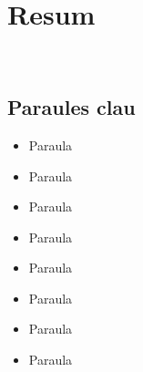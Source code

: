 \chapter*{Resum}\label{ch:abstract-ca}

\lipsum[1-3] \\

\section*{Paraules clau}\label{sec:keywords-ca}
\begin{multicols}{2}
    \begin{itemize}
        \item Paraula
        \item Paraula
        \item Paraula
        \item Paraula
    \end{itemize}
    \columnbreak
    \begin{itemize}
        \item Paraula
        \item Paraula
        \item Paraula
        \item Paraula
    \end{itemize}
\end{multicols}